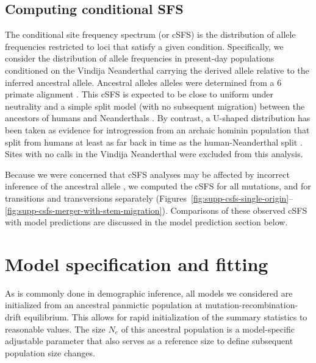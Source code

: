 \documentclass[]{article}
\begin{document}
\subsection{Computing conditional SFS}\label{sec:computing-csfs}

The conditional site frequency spectrum (or cSFS) is the distribution of allele
frequencies restricted to loci that satisfy a given condition. Specifically, we
consider the distribution of allele frequencies in present-day populations
conditioned on the Vindija Neanderthal carrying the derived allele relative to
the inferred ancestral allele. Ancestral alleles alleles were determined from a
6 primate alignment \citep{1000_Genomes_Project_Consortium2015-zq}.
This cSFS is expected to be close to
uniform under neutrality and a simple split model (with no subsequent
migration) between the ancestors of humans and Neanderthals
\citep{Chen2007-iy}. By contrast, a U-shaped distribution has been taken as
evidence for introgression from an archaic hominin population that split
from humans at least as far back in time as the human-Neanderthal split
\citep{Yang2012-ze,Durvasula2020-td}.
Sites with no calls in the Vindija Neanderthal were excluded from
this analysis.

Because we were concerned that cSFS analyses may be affected by incorrect
inference of the ancestral allele \citep{Hernandez2007-mf}, we computed the cSFS
for all mutations, and for transitions and transversions separately
(Figures~\ref{fig:supp-csfs-single-origin}--\ref{fig:supp-csfs-merger-with-stem-migration}).
Comparisons of these observed cSFS with model
predictions are discussed in the model prediction section below. 

\section{Model specification and fitting}
\label{sec:modelspec}

As is commonly done in demographic inference, 
all models we considered are initialized from an ancestral panmictic population at 
mutation-recombination-drift equilibrium. This allows for rapid initialization of the 
summary statistics to reasonable values.
The size $N_e$ of this ancestral population is a model-specific adjustable parameter 
that also serves as a reference size to define subsequent population size changes.   
\end{document}

